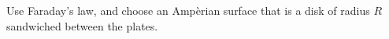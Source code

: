 Use Faraday's law, and choose an Amp\`{e}rian surface that
is a disk of radius $R$ sandwiched between the plates.
